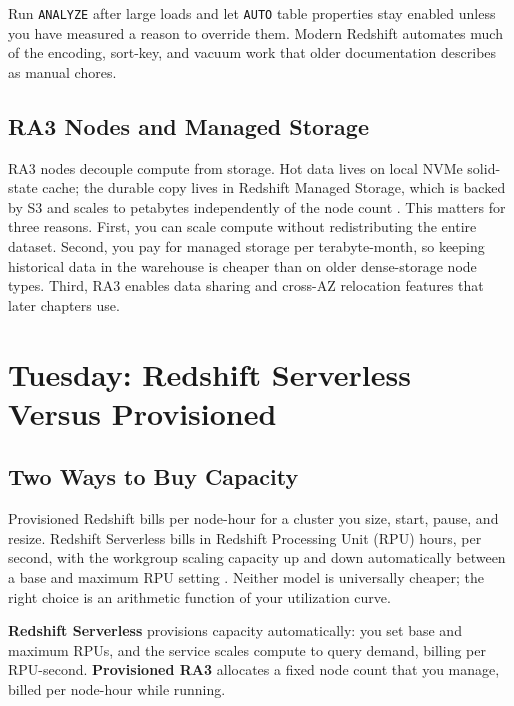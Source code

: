\begin{tipbox}
Run \texttt{ANALYZE} after large loads and let \texttt{AUTO} table properties stay enabled unless you have measured a reason to override them. Modern Redshift automates much of the encoding, sort-key, and vacuum work that older documentation describes as manual chores.
\end{tipbox}

\subsection{RA3 Nodes and Managed Storage}
RA3 nodes decouple compute from storage. Hot data lives on local NVMe solid-state cache; the durable copy lives in Redshift Managed Storage, which is backed by S3 and scales to petabytes independently of the node count \cite{awsRedshiftDocs}. This matters for three reasons. First, you can scale compute without redistributing the entire dataset. Second, you pay for managed storage per terabyte-month, so keeping historical data in the warehouse is cheaper than on older dense-storage node types. Third, RA3 enables data sharing and cross-AZ relocation features that later chapters use.

\section{Tuesday: Redshift Serverless Versus Provisioned}
\subsection{Two Ways to Buy Capacity}
Provisioned Redshift bills per node-hour for a cluster you size, start, pause, and resize. Redshift Serverless bills in Redshift Processing Unit (RPU) hours, per second, with the workgroup scaling capacity up and down automatically between a base and maximum RPU setting \cite{awsRedshiftServerlessDocs}. Neither model is universally cheaper; the right choice is an arithmetic function of your utilization curve.

\begin{definitionbox}
\textbf{Redshift Serverless} provisions capacity automatically: you set base and maximum RPUs, and the service scales compute to query demand, billing per RPU-second. \textbf{Provisioned RA3} allocates a fixed node count that you manage, billed per node-hour while running.
\end{definitionbox}

